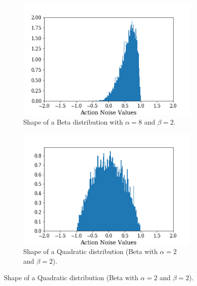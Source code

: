             \begin{figure}
                \vspace{4.0cm}
                \centering
                \begin{subfigure}[b]{0.45\textwidth}
                    \centering
                    \includegraphics[width=\textwidth]{images/results/noises_beta_dist.png}
                    \caption{Shape of a Beta distribution with $\alpha=8$ and $\beta=2$.}
                    \label{fig:noises_beta_dist}
                \end{subfigure}
                \hfill
                \begin{subfigure}[b]{0.45\textwidth}
                    \centering
                    \includegraphics[width=\textwidth]{images/results/noises_quad_dist.png}
                    \caption{Shape of a Quadratic distribution (Beta with $\alpha=2$ and $\beta=2$).}

\end{subfigure}
\end{figure}

